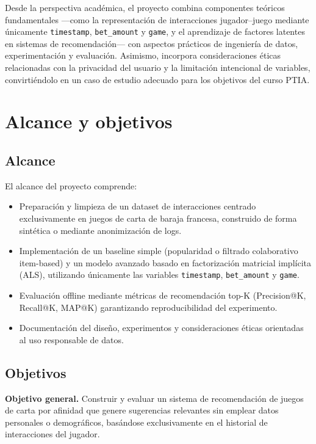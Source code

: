 \documentclass[12pt,a4paper]{article}
\begin{document}
Desde la perspectiva académica, el proyecto combina componentes teóricos fundamentales ---como la representación de interacciones jugador--juego mediante únicamente \texttt{timestamp}, \texttt{bet\_amount} y \texttt{game}, y el aprendizaje de factores latentes en sistemas de recomendación--- con aspectos prácticos de ingeniería de datos, experimentación y evaluación. Asimismo, incorpora consideraciones éticas relacionadas con la privacidad del usuario y la limitación intencional de variables, convirtiéndolo en un caso de estudio adecuado para los objetivos del curso PTIA.



\section{Alcance y objetivos}

\subsection{Alcance}

El alcance del proyecto comprende:

\begin{itemize}
    \item Preparación y limpieza de un dataset de interacciones centrado exclusivamente en juegos de carta de baraja francesa, construido de forma sintética o mediante anonimización de logs.
    \item Implementación de un baseline simple (popularidad o filtrado colaborativo item-based) y un modelo avanzado basado en factorización matricial implícita (ALS), utilizando únicamente las variables \texttt{timestamp}, \texttt{bet\_amount} y \texttt{game}.
    \item Evaluación offline mediante métricas de recomendación top-K (Precision@K, Recall@K, MAP@K) garantizando reproducibilidad del experimento.
    \item Documentación del diseño, experimentos y consideraciones éticas orientadas al uso responsable de datos.
\end{itemize}

\subsection{Objetivos}

\textbf{Objetivo general.} Construir y evaluar un sistema de recomendación de juegos de carta por afinidad que genere sugerencias relevantes sin emplear datos personales o demográficos, basándose exclusivamente en el historial de interacciones del jugador.
\end{document}
